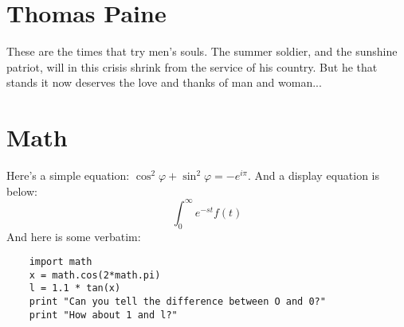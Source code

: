 \documentclass[12pt]{scrartcl}
\newcommand{\laplace}{$$\int_0^\infty e^{-st}f(t)$$}
\begin{document}
\section{Thomas Paine}
    
    These are the times that try men's souls. The summer soldier, and the sunshine patriot, will in this crisis shrink from the service of his country. But he that stands it now deserves the love and thanks of man and woman...

\section{Math}

Here's a simple equation: $\cos^2 \varphi + \sin^2 \varphi = -e^{i\pi}$. And a display equation is below:
    \laplace
And here is some verbatim:
\begin{verbatim}
    import math
    x = math.cos(2*math.pi)
    l = 1.1 * tan(x)
    print "Can you tell the difference between O and 0?"
    print "How about 1 and l?"
\end{verbatim}  


    
\end{document}

